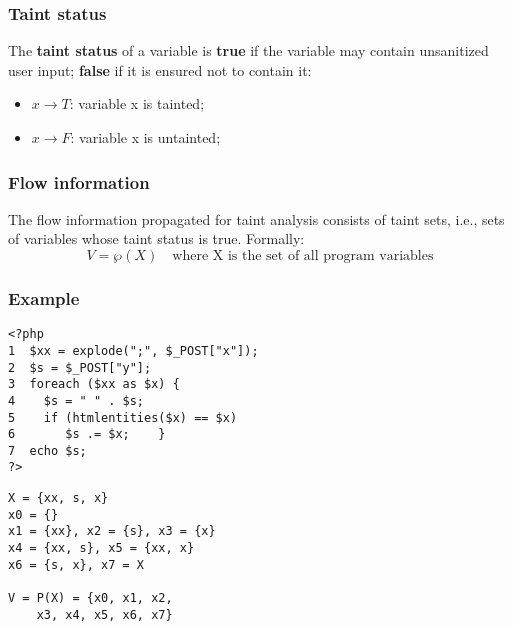 \documentclass[a4paper, 10pt, titlepage]{article}
\begin{document}
\subsubsection*{Taint status}
The \textbf{taint status} of a variable is \textbf{true} if the variable may contain unsanitized user input; \textbf{false} if it is ensured not to contain it:
\begin{itemize}
\item $x \rightarrow T$: variable x is tainted;
\item $x \rightarrow F$: variable x is untainted;
\end{itemize}

\subsubsection*{Flow information}
The flow information propagated for taint analysis consists of taint sets, i.e., sets of variables whose taint status is true. Formally: 
\begin{equation*}
V = \wp(X) \quad \text{where X is the set of all program variables}
\end{equation*}

\subsubsection*{Example}
\begin{minipage}{0.5\textwidth}
\begin{small}
\begin{lstlisting}
<?php 
1  $xx = explode(";", $_POST["x"]); 
2  $s = $_POST["y"]; 
3  foreach ($xx as $x) { 
4    $s = " " . $s; 
5    if (htmlentities($x) == $x) 
6       $s .= $x;    } 
7  echo $s; 
?>
\end{lstlisting}
\end{small}
\end{minipage}
\hfill\vline\hfill
\begin{minipage}{0.4\textwidth}
\begin{small}
\begin{lstlisting}
X = {xx, s, x} 
x0 = {} 
x1 = {xx}, x2 = {s}, x3 = {x} 
x4 = {xx, s}, x5 = {xx, x} 
x6 = {s, x}, x7 = X 

V = P(X) = {x0, x1, x2, 
	x3, x4,	x5, x6, x7}
\end{lstlisting}
\end{small}
\end{minipage}
\end{document}
